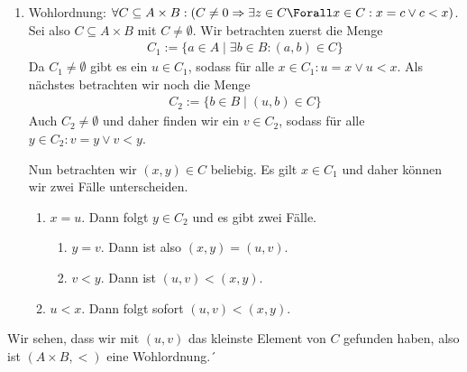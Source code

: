 \begin{solution}
\begin{enumerate}
		\item Wohlordnung: $\forall C \subseteq A \times B: (C \neq 0 \Rightarrow \exists z \in C \Forall x \in C: x = c \lor c < x)$. Sei also $C \subseteq A \times B$ mit $C \neq \emptyset$. Wir betrachten zuerst die Menge
			\begin{align*}
				C_1 := \{a \in A \mid \exists b \in B: (a,b) \in C\}
			\end{align*}
		Da $C_1 \neq \emptyset$ gibt es ein $u \in C_1$, sodass für alle $x \in C_1: u = x \lor u < x$. Als nächstes betrachten wir noch die Menge
			\begin{align*}
				C_2 := \{b \in B \mid (u, b) \in C\}
			\end{align*}
		Auch $C_2 \neq \emptyset$ und daher finden wir ein $v \in C_2$, sodass für alle $y \in C_2: v = y \lor v < y$. 
		
		Nun betrachten wir $(x,y) \in C$ beliebig. Es gilt $x \in C_1$ und daher können wir zwei Fälle unterscheiden.
		\begin{enumerate}[label = Fall \arabic*:]
			\item $x = u$. Dann folgt $y \in C_2$ und es gibt zwei Fälle.
				\begin{enumerate}[label = Fall 1.\arabic*]
					\item $y = v$. Dann ist also $(x,y) = (u,v)$.
					\item $v < y$. Dann ist $(u,v) < (x,y)$.
				\end{enumerate} 
			
			\item $u < x$. Dann folgt sofort $(u,v) < (x,y)$. 
		\end{enumerate}
	\end{enumerate}

	Wir sehen, dass wir mit $(u,v)$ das kleinste Element von $C$ gefunden haben, also ist $(A \times B, <)$ eine Wohlordnung.´

\end{solution}
